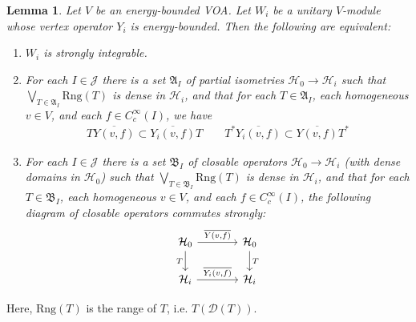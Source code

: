 \documentclass[11pt,b5paper,notitlepage]{article}
\theoremstyle{definition}
\theoremstyle{plain}
\newtheorem{lm}[df]{Lemma}
\newcommand{\fk}{\mathfrak}
\newcommand{\mc}{\mathcal}
\newcommand{\ovl}{\overline}
\newcommand{\Dom}{\scr D}
\newcommand{\scr}{\mathscr}
\newcommand{\Rng}{\mathrm{Rng}}
\numberwithin{equation}{section}
\begin{document}
\begin{lm}\label{lb43}
Let $V$ be an energy-bounded VOA. Let $W_i$ be a unitary $V$-module whose vertex operator $Y_i$ is energy-bounded. Then the following are equivalent:
\begin{enumerate}[label=(\arabic*)]
\item $W_i$ is strongly integrable.
\item For each $I\in\mc J$ there is a set $\fk A_I$ of partial isometries $\mc H_0\rightarrow\mc H_i$ such that $\bigvee_{T\in\fk A_I}\Rng(T)$ is dense in $\mc H_i$, and that for each $T\in\fk A_I$, each homogeneous $v\in V$, and each $f\in C_c^\infty(I)$, we have
\begin{align}
T\ovl{Y(v,f)}\subset \ovl{Y_i(v,f)}T\qquad T^*\ovl{Y_i(v,f)}\subset \ovl{Y(v,f)}T^*
\end{align}
\item For each $I\in\mc J$ there is a set $\fk B_I$ of closable operators $\mc H_0\rightarrow\mc H_i$ (with dense domains in $\mc H_0$) such that $\bigvee_{T\in\fk B_I}\Rng(T)$ is dense in $\mc H_i$, and that for each $T\in\fk B_I$, each homogeneous $v\in V$, and each $f\in C_c^\infty(I)$, the following diagram of closable operators commutes strongly:
\begin{equation}
\begin{tikzcd}[column sep=large]
\mc H_0 \arrow[d,"T"'] \arrow[r,"{\ovl{Y(v,f)}}"] & \mc H_0 \arrow[d,"T"] \\
\mc H_i \arrow[r,"{\ovl{Y_i(v,f)}}"]           & \mc H_i        
\end{tikzcd}
\end{equation}
\end{enumerate}
\end{lm}

Here, $\Rng(T)$ is the range of $T$, i.e. $T(\Dom(T))$.
\end{document}
